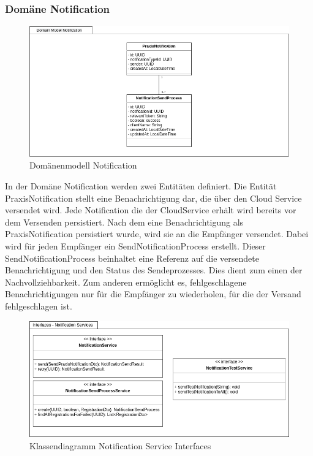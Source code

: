 \clearpage

\subsubsection{Domäne Notification}

\begin{figure}[h]
    \centering
    \begin{minipage}[b]{1.0\textwidth}
        \includegraphics[width=\textwidth]{graphics/Class_Notification_Domain}
        \caption{Domänenmodell Notification}
    \end{minipage}
\end{figure}

In der Domäne Notification werden zwei Entitäten definiert.
Die Entität PraxisNotification stellt eine Benachrichtigung dar, die über den Cloud Service versendet wird.
Jede Notification die der CloudService erhält wird bereits vor dem Versenden persistiert.
Nach dem eine Benachrichtigung als PraxisNotification persistiert wurde, wird sie an die Empfänger versendet.
Dabei wird für jeden Empfänger ein SendNotificationProcess erstellt.
Dieser SendNotificationProcess beinhaltet eine Referenz auf die versendete Benachrichtigung und den Status des Sendeprozesses.
Dies dient zum einen der Nachvollziehbarkeit.
Zum anderen ermöglicht es, fehlgeschlagene Benachrichtigungen nur für die Empfänger zu wiederholen, für die der Versand fehlgeschlagen ist.

\begin{figure}[h]
    \centering
    \begin{minipage}[b]{0.9\textwidth}
        \includegraphics[width=\textwidth]{graphics/Class_Notification_Services}
        \caption{Klassendiagramm Notification Service Interfaces}
    \end{minipage}
\end{figure}

